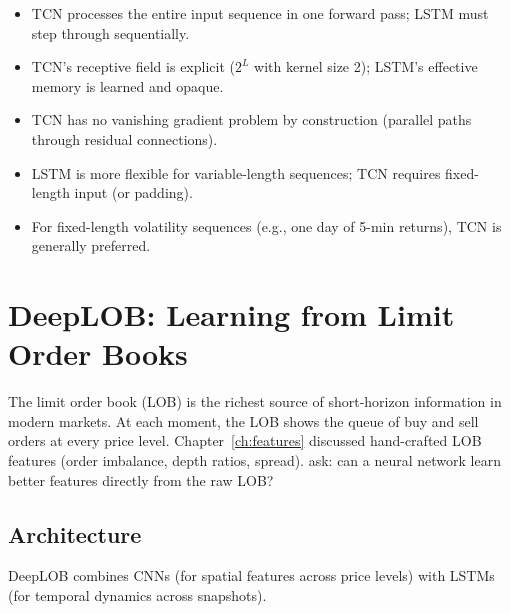 \begin{keyidea}
\begin{itemize}[nosep]
  \item TCN processes the entire input sequence in one forward pass; LSTM must step through sequentially.
  \item TCN's receptive field is explicit ($2^L$ with kernel size 2); LSTM's effective memory is learned and opaque.
  \item TCN has no vanishing gradient problem by construction (parallel paths through residual connections).
  \item LSTM is more flexible for variable-length sequences; TCN requires fixed-length input (or padding).
  \item For fixed-length volatility sequences (e.g., one day of 5-min returns), TCN is generally preferred.
\end{itemize}
\end{keyidea}


\section{DeepLOB: Learning from Limit Order Books}\label{sec:dl:deeplob}

The limit order book (LOB) is the richest source of short-horizon information in modern markets.
At each moment, the LOB shows the queue of buy and sell orders at every price level.
Chapter~\ref{ch:features} discussed hand-crafted LOB features (order imbalance, depth ratios, spread).
\citet{ZhangZohrenRoberts2019DeepLOB} ask: can a neural network learn better features directly from the raw LOB?

\subsection{Architecture}

DeepLOB combines CNNs (for spatial features across price levels) with LSTMs (for temporal dynamics across snapshots).


